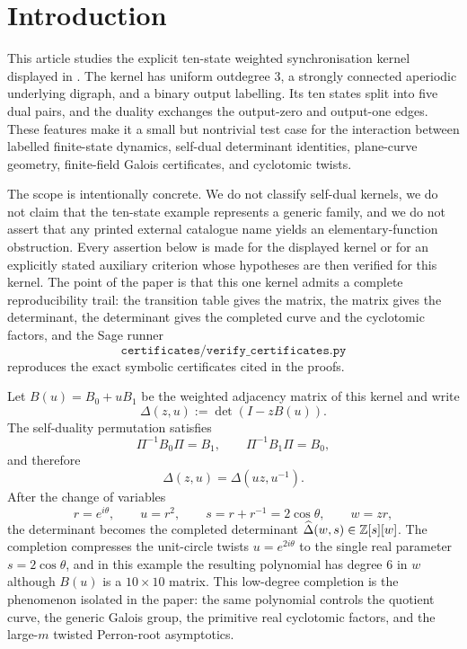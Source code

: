 \section{Introduction}\label{sec:introduction}

This article studies the explicit ten-state weighted synchronisation
kernel displayed in .  The kernel has
uniform outdegree \(3\), a strongly connected aperiodic underlying
digraph, and a binary output labelling.  Its ten states split into five
dual pairs, and the duality exchanges the output-zero and output-one
edges.  These features make it a small but nontrivial test case for the
interaction between labelled finite-state dynamics, self-dual determinant
identities, plane-curve geometry, finite-field Galois certificates, and
cyclotomic twists.

The scope is intentionally concrete.  We do not classify
self-dual kernels, we do not claim that the ten-state example represents
a generic family, and we do not assert that any printed external
catalogue name yields an elementary-function obstruction.  Every
assertion below is made for the displayed kernel or for an explicitly
stated auxiliary criterion whose hypotheses are then verified for this
kernel.  The point of the paper is that this one kernel admits a
complete reproducibility trail: the transition table gives the matrix,
the matrix gives the determinant, the determinant gives the completed
curve and the cyclotomic factors, and the Sage runner
\[
  \texttt{certificates/verify\_certificates.py}
\]
reproduces the exact symbolic certificates cited in the proofs.

Let \(B(u)=B_0+uB_1\) be the weighted adjacency matrix of this kernel and
write
\[
  \Delta(z,u):=\det(I-zB(u)).
\]
The self-duality permutation satisfies
\[
  \Pi^{-1}B_0\Pi=B_1,\qquad \Pi^{-1}B_1\Pi=B_0,
\]
and therefore
\[
  \Delta(z,u)=\Delta(uz,u^{-1}).
\]
After the change of variables
\[
  r=e^{i\theta},\qquad u=r^2,\qquad
  s=r+r^{-1}=2\cos\theta,\qquad w=zr,
\]
the determinant becomes the completed determinant
\(\widehat\Delta(w,s)\in\mathbb{Z}[s][w]\).  The completion compresses the
unit-circle twists \(u=e^{2i\theta}\) to the single real parameter
\(s=2\cos\theta\), and in this example the resulting polynomial has
degree \(6\) in \(w\) although \(B(u)\) is a \(10\times10\) matrix.
This low-degree completion is the phenomenon isolated in the paper: the
same polynomial controls the quotient curve, the generic Galois group,
the primitive real cyclotomic factors, and the large-\(m\) twisted
Perron-root asymptotics.

